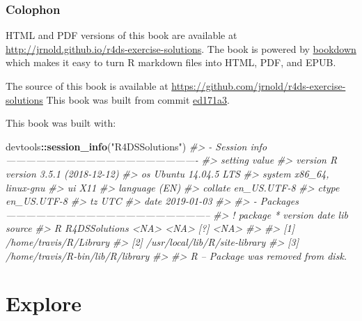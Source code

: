 \documentclass[]{book}
\newenvironment{Shaded}{\begin{snugshade}}{\end{snugshade}}
\newcommand{\CommentTok}[1]{\textcolor[rgb]{0.56,0.35,0.01}{\textit{#1}}}
\newcommand{\KeywordTok}[1]{\textcolor[rgb]{0.13,0.29,0.53}{\textbf{#1}}}
\newcommand{\NormalTok}[1]{#1}
\newcommand{\OperatorTok}[1]{\textcolor[rgb]{0.81,0.36,0.00}{\textbf{#1}}}
\newcommand{\StringTok}[1]{\textcolor[rgb]{0.31,0.60,0.02}{#1}}
\theoremstyle{plain}
\theoremstyle{remark}
\begin{document}
\hypertarget{colophon}{%
\section*{Colophon}\label{colophon}}

HTML and PDF versions of this book are available at \url{http://jrnold.github.io/r4ds-exercise-solutions}.
The book is powered by \href{https://bookdown.org}{bookdown} which makes it easy to turn R markdown files into HTML, PDF, and EPUB.

The source of this book is available at \url{https://github.com/jrnold/r4ds-exercise-solutions}
This book was built from commit \href{https://github.com/jrnold/r4ds-exercise-solutions/tree/ed171a397f4c887d2d6306ed51df264457c99d82}{ed171a3}.

This book was built with:

\begin{Shaded}
\begin{Highlighting}[]
\NormalTok{devtools}\OperatorTok{::}\KeywordTok{session_info}\NormalTok{(}\StringTok{"R4DSSolutions"}\NormalTok{)}
\CommentTok{#> - Session info ----------------------------------------------------------}
\CommentTok{#>  setting  value                       }
\CommentTok{#>  version  R version 3.5.1 (2018-12-12)}
\CommentTok{#>  os       Ubuntu 14.04.5 LTS          }
\CommentTok{#>  system   x86_64, linux-gnu           }
\CommentTok{#>  ui       X11                         }
\CommentTok{#>  language (EN)                        }
\CommentTok{#>  collate  en_US.UTF-8                 }
\CommentTok{#>  ctype    en_US.UTF-8                 }
\CommentTok{#>  tz       UTC                         }
\CommentTok{#>  date     2019-01-03                  }
\CommentTok{#> }
\CommentTok{#> - Packages --------------------------------------------------------------}
\CommentTok{#>  ! package       * version date lib source}
\CommentTok{#>  R R4DSSolutions   <NA>    <NA> [?] <NA>  }
\CommentTok{#> }
\CommentTok{#> [1] /home/travis/R/Library}
\CommentTok{#> [2] /usr/local/lib/R/site-library}
\CommentTok{#> [3] /home/travis/R-bin/lib/R/library}
\CommentTok{#> }
\CommentTok{#>  R -- Package was removed from disk.}
\end{Highlighting}
\end{Shaded}

\hypertarget{part-explore}{%
\part{Explore}\label{part-explore}}
\end{document}
